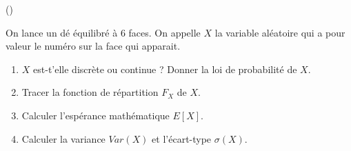 \begin{exercice}\label{exo4-2} (\minsyndical)

On lance un d\'e \'equilibr\'e \`a 6 faces. On appelle $X$ la variable al\'eatoire qui a pour valeur le num\'ero sur la face qui apparait.

\begin{enumerate}

 \item $X$ est-t'elle discr\`ete ou continue ? Donner la loi de probabilit\'e de $X$.

 \item Tracer la fonction de r\'epartition $F_X$ de $X$.

 \item Calculer l'esp\'erance math\'ematique $E[X]$.
 
 \item Calculer la variance $Var(X)$ et l'\'ecart-type $\sigma(X)$.
 
\end{enumerate}


\end{exercice}
